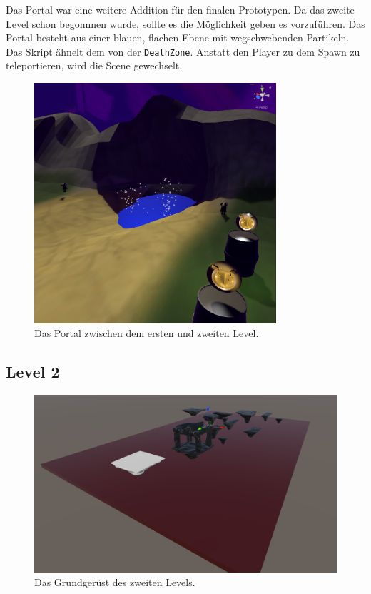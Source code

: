 \begin{minipage}[t]{0.4\textwidth}
  Das Portal war eine weitere Addition für den finalen Prototypen. Da das zweite Level schon begonnnen wurde, sollte es die Möglichkeit geben es vorzuführen. Das Portal besteht aus einer blauen, flachen Ebene mit wegschwebenden Partikeln. Das Skript ähnelt dem von der \verb+DeathZone+. Anstatt den Player zu dem Spawn zu teleportieren, wird die Scene gewechselt.

\end{minipage}
\hfill
\begin{minipage}[t]{0.6\textwidth}
  \begin{figure}[H]
    \centering
    \includegraphics[width=0.8\textwidth]{chapters/04/images/V3/Portal.png}
    \caption{Das Portal zwischen dem ersten und zweiten Level.}
  \end{figure}
\end{minipage}


\pagebreak

\subsection{Level 2}
\begin{figure}[h]
  \centering
  \includegraphics*[width=1\textwidth]{chapters/04/images/V3/Level2.png}
  \caption{Das Grundgerüst des zweiten Levels.}
  \label{fig:PE09}
\end{figure}

